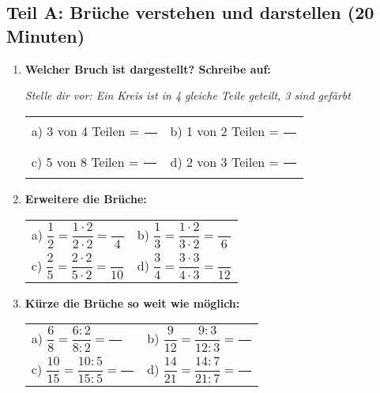 \subsection*{Teil A: Brüche verstehen und darstellen (20 Minuten)}

\begin{enumerate}[label=\arabic*.]
    \item \textbf{Welcher Bruch ist dargestellt? Schreibe auf:}
    \vspace{0.5cm}

    \textit{Stelle dir vor: Ein Kreis ist in 4 gleiche Teile geteilt, 3 sind gefärbt}

    \begin{tabular}{ll}
        a) 3 von 4 Teilen = $\dfrac{\phantom{00}}{\phantom{00}}$ & b) 1 von 2 Teilen = $\dfrac{\phantom{00}}{\phantom{00}}$ \\[2ex]
        c) 5 von 8 Teilen = $\dfrac{\phantom{00}}{\phantom{00}}$ & d) 2 von 3 Teilen = $\dfrac{\phantom{00}}{\phantom{00}}$
    \end{tabular}

    \vspace{1cm}

    \item \textbf{Erweitere die Brüche:} 
    \vspace{0.5cm}
    
    \begin{tabular}{ll}
        a) $\dfrac{1}{2} = \dfrac{1 \cdot 2}{2 \cdot 2} = \dfrac{\phantom{00}}{4}$ & b) $\dfrac{1}{3} = \dfrac{1 \cdot 2}{3 \cdot 2} = \dfrac{\phantom{00}}{6}$ \\[4ex]
        c) $\dfrac{2}{5} = \dfrac{2 \cdot 2}{5 \cdot 2} = \dfrac{\phantom{00}}{10}$ & d) $\dfrac{3}{4} = \dfrac{3 \cdot 3}{4 \cdot 3} = \dfrac{\phantom{00}}{12}$
    \end{tabular}

    \vspace{1cm}

    \item \textbf{Kürze die Brüche so weit wie möglich:} 
    \vspace{0.5cm}

    \begin{tabular}{ll}
        a) $\dfrac{6}{8} = \dfrac{6:2}{8:2} = \dfrac{\phantom{00}}{\phantom{00}}$ & b) $\dfrac{9}{12} = \dfrac{9:3}{12:3} = \dfrac{\phantom{00}}{\phantom{00}}$ \\[4ex]
        c) $\dfrac{10}{15} = \dfrac{10:5}{15:5} = \dfrac{\phantom{00}}{\phantom{00}}$ & d) $\dfrac{14}{21} = \dfrac{14:7}{21:7} = \dfrac{\phantom{00}}{\phantom{00}}$
    \end{tabular}
\end{enumerate}